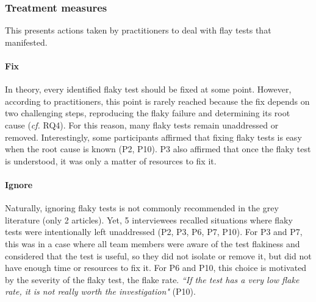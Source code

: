 \subsubsection{Treatment measures}
This presents actions taken by practitioners to deal with flay tests that manifested.

\paragraph{\textbf{Fix}}
In theory, every identified flaky test should be fixed at some point.
However, according to practitioners, this point is rarely reached because the fix depends on two challenging steps, reproducing the flaky failure and determining its root cause (\textit{cf. } RQ4).
For this reason, many flaky tests remain unaddressed or removed.
Interestingly, some participants affirmed that fixing flaky tests is easy when the root cause is known (P2, P10).
P3 also affirmed that once the flaky test is understood, it was only a matter of resources to fix it.

\paragraph{\textbf{Ignore}}
Naturally, ignoring flaky tests is not commonly recommended in the grey literature (only 2 articles).
Yet, 5 interviewees recalled situations where flaky tests were intentionally left unaddressed (P2, P3, P6, P7, P10).
For P3 and P7, this was in a case where all team members were aware of the test flakiness and considered that the test is useful, so they did not isolate or remove it, but did not have enough time or resources to fix it.
For P6 and P10, this choice is motivated by the severity of the flaky test, \ie the flake rate.
\textit{``If the test has a very low flake rate, it is not really worth the investigation"} (P10).

